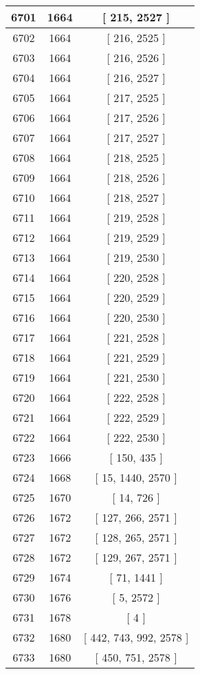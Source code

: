 \begin{center}
\begin{longtable}[H]{|| c c c ||}
6701 & 1664 & [ 215, 2527 ] \\ 
\hline
6702 & 1664 & [ 216, 2525 ] \\ 
\hline
6703 & 1664 & [ 216, 2526 ] \\ 
\hline
6704 & 1664 & [ 216, 2527 ] \\ 
\hline
6705 & 1664 & [ 217, 2525 ] \\ 
\hline
6706 & 1664 & [ 217, 2526 ] \\ 
\hline
6707 & 1664 & [ 217, 2527 ] \\ 
\hline
6708 & 1664 & [ 218, 2525 ] \\ 
\hline
6709 & 1664 & [ 218, 2526 ] \\ 
\hline
6710 & 1664 & [ 218, 2527 ] \\ 
\hline
6711 & 1664 & [ 219, 2528 ] \\ 
\hline
6712 & 1664 & [ 219, 2529 ] \\ 
\hline
6713 & 1664 & [ 219, 2530 ] \\ 
\hline
6714 & 1664 & [ 220, 2528 ] \\ 
\hline
6715 & 1664 & [ 220, 2529 ] \\ 
\hline
6716 & 1664 & [ 220, 2530 ] \\ 
\hline
6717 & 1664 & [ 221, 2528 ] \\ 
\hline
6718 & 1664 & [ 221, 2529 ] \\ 
\hline
6719 & 1664 & [ 221, 2530 ] \\ 
\hline
6720 & 1664 & [ 222, 2528 ] \\ 
\hline
6721 & 1664 & [ 222, 2529 ] \\ 
\hline
6722 & 1664 & [ 222, 2530 ] \\ 
\hline
6723 & 1666 & [ 150, 435 ] \\ 
\hline
6724 & 1668 & [ 15, 1440, 2570 ] \\ 
\hline
6725 & 1670 & [ 14, 726 ] \\ 
\hline
6726 & 1672 & [ 127, 266, 2571 ] \\ 
\hline
6727 & 1672 & [ 128, 265, 2571 ] \\ 
\hline
6728 & 1672 & [ 129, 267, 2571 ] \\ 
\hline
6729 & 1674 & [ 71, 1441 ] \\ 
\hline
6730 & 1676 & [ 5, 2572 ] \\ 
\hline
6731 & 1678 & [ 4 ] \\ 
\hline
6732 & 1680 & [ 442, 743, 992, 2578 ] \\ 
\hline
6733 & 1680 & [ 450, 751, 2578 ] \\ 

\end{longtable}
\end{center}

